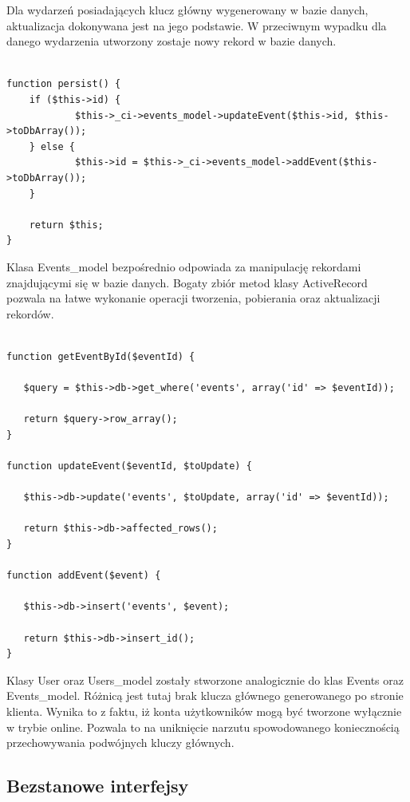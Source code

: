Dla wydarzeń posiadających klucz główny wygenerowany w bazie danych, aktualizacja dokonywana jest na jego podstawie. W przeciwnym wypadku dla danego wydarzenia utworzony zostaje nowy rekord w bazie danych.

\begin{lstlisting}[caption=Aktualizacja obiektu Event w bazie danych., label=amb, captionpos=b]

function persist() {
   	if ($this->id) {
       		$this->_ci->events_model->updateEvent($this->id, $this->toDbArray());
   	} else {
       		$this->id = $this->_ci->events_model->addEvent($this->toDbArray());
   	}

   	return $this;
}

\end{lstlisting}

Klasa Events\_model bezpośrednio odpowiada za manipulację rekordami znajdującymi się w bazie danych. Bogaty zbiór metod klasy ActiveRecord pozwala na łatwe wykonanie operacji tworzenia, pobierania oraz aktualizacji rekordów.

\begin{lstlisting}[caption=Przykładowe metody klasy Events\_model odpowiedzialne za komunikację z bazą danych., label=amb, captionpos=b]

function getEventById($eventId) {
	
   $query = $this->db->get_where('events', array('id' => $eventId));

   return $query->row_array();
}

function updateEvent($eventId, $toUpdate) {

   $this->db->update('events', $toUpdate, array('id' => $eventId));

   return $this->db->affected_rows();
}

function addEvent($event) {
   	
   $this->db->insert('events', $event);

   return $this->db->insert_id();
}

\end{lstlisting}

Klasy User oraz Users\_model zostały stworzone analogicznie do klas Events oraz Events\_model. Różnicą jest tutaj brak klucza głównego generowanego po stronie klienta. Wynika to z faktu, iż konta użytkowników mogą być tworzone wyłącznie w trybie online. Pozwala to na uniknięcie narzutu spowodowanego koniecznością przechowywania podwójnych kluczy głównych.

\subsection{Bezstanowe interfejsy}
\label{bezstInter}

